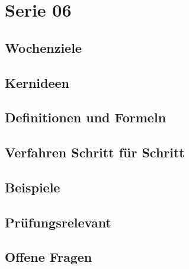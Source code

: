 \chapter{Serie 06}
\label{kap:serie06}

\section*{Wochenziele}
\begin{wochenziele}
\end{wochenziele}

\section{Kernideen}

\section{Definitionen und Formeln}

\section{Verfahren Schritt für Schritt}

\section{Beispiele}

\section{Prüfungsrelevant}

\section{Offene Fragen}
